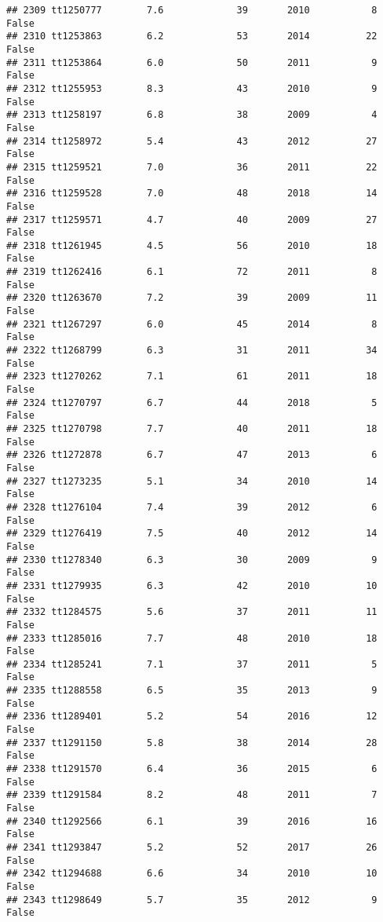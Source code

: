 \documentclass[
]{article}
\begin{document}
\begin{verbatim}
## 2309 tt1250777        7.6             39       2010           8   False
## 2310 tt1253863        6.2             53       2014          22   False
## 2311 tt1253864        6.0             50       2011           9   False
## 2312 tt1255953        8.3             43       2010           9   False
## 2313 tt1258197        6.8             38       2009           4   False
## 2314 tt1258972        5.4             43       2012          27   False
## 2315 tt1259521        7.0             36       2011          22   False
## 2316 tt1259528        7.0             48       2018          14   False
## 2317 tt1259571        4.7             40       2009          27   False
## 2318 tt1261945        4.5             56       2010          18   False
## 2319 tt1262416        6.1             72       2011           8   False
## 2320 tt1263670        7.2             39       2009          11   False
## 2321 tt1267297        6.0             45       2014           8   False
## 2322 tt1268799        6.3             31       2011          34   False
## 2323 tt1270262        7.1             61       2011          18   False
## 2324 tt1270797        6.7             44       2018           5   False
## 2325 tt1270798        7.7             40       2011          18   False
## 2326 tt1272878        6.7             47       2013           6   False
## 2327 tt1273235        5.1             34       2010          14   False
## 2328 tt1276104        7.4             39       2012           6   False
## 2329 tt1276419        7.5             40       2012          14   False
## 2330 tt1278340        6.3             30       2009           9   False
## 2331 tt1279935        6.3             42       2010          10   False
## 2332 tt1284575        5.6             37       2011          11   False
## 2333 tt1285016        7.7             48       2010          18   False
## 2334 tt1285241        7.1             37       2011           5   False
## 2335 tt1288558        6.5             35       2013           9   False
## 2336 tt1289401        5.2             54       2016          12   False
## 2337 tt1291150        5.8             38       2014          28   False
## 2338 tt1291570        6.4             36       2015           6   False
## 2339 tt1291584        8.2             48       2011           7   False
## 2340 tt1292566        6.1             39       2016          16   False
## 2341 tt1293847        5.2             52       2017          26   False
## 2342 tt1294688        6.6             34       2010          10   False
## 2343 tt1298649        5.7             35       2012           9   False

\end{verbatim}
\end{document}
